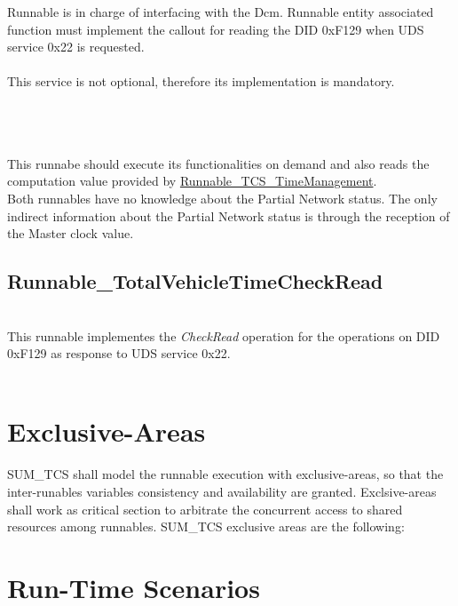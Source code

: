 Runnable is in charge of interfacing with the Dcm. Runnable entity associated function must implement the callout for reading the DID 0xF129 when UDS service 0x22 is requested.
\\
\\
This service is not optional, therefore its implementation is mandatory. 


\\
\\
\\
This runnabe should execute its functionalities on demand and also reads the computation value provided by \hyperref[subsec:Runnable_TCS_TimeManagement]{Runnable\_TCS_TimeManagement}. 
\\
Both runnables have no knowledge about the Partial Network status. The only indirect information about the Partial Network status is through the reception of the Master clock value.
\\{}

\subsection{Runnable_TotalVehicleTimeCheckRead}
\label{subsec:RunTotVehicleTimeCheckRead}

\\
This runnable implementes the \textit{CheckRead} operation for the operations on DID 0xF129 as response to UDS service 0x22.
\\
{}
\\




\section{Exclusive-Areas}
SUM\_TCS shall model the runnable execution with exclusive-areas, so that the inter-runables variables consistency and availability are granted. Exclsive-areas shall work as critical section to arbitrate
the concurrent access to shared resources among runnables. SUM\_TCS exclusive areas are the following: 



\section{Run-Time Scenarios}

